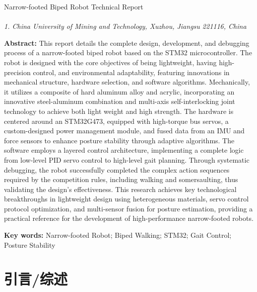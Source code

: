 \documentclass[a4paper,fontset=windows]{ctexart}
\begin{document}
{
    \vspace{1cm}
    \begin{center}
        \heiti Narrow-footed Biped Robot Technical Report \\
        \vspace{0.5cm}
         \\
        \vspace{0.2cm}
         \textit{1. China University of Mining and Technology, Xuzhou, Jiangsu 221116, China}
    \end{center}

    {\bfseries Abstract: }This report details the complete design, development, and debugging process of a narrow-footed biped robot based on the STM32 microcontroller. The robot is designed with the core objectives of being lightweight, having high-precision control, and environmental adaptability, featuring innovations in mechanical structure, hardware selection, and software algorithms. Mechanically, it utilizes a composite of hard aluminum alloy and acrylic, incorporating an innovative steel-aluminum combination and multi-axis self-interlocking joint technology to achieve both light weight and high strength. The hardware is centered around an STM32G473, equipped with high-torque bus servos, a custom-designed power management module, and fused data from an IMU and force sensors to enhance posture stability through adaptive algorithms. The software employs a layered control architecture, implementing a complete logic from low-level PID servo control to high-level gait planning. Through systematic debugging, the robot successfully completed the complex action sequences required by the competition rules, including walking and somersaulting, thus validating the design's effectiveness. This research achieves key technological breakthroughs in lightweight design using heterogeneous materials, servo control protocol optimization, and multi-sensor fusion for posture estimation, providing a practical reference for the development of high-performance narrow-footed robots.

    {\bfseries Key words: }Narrow-footed Robot; Biped Walking; STM32; Gait Control; Posture Stability
}

\newpage

\section{引言/综述}
\end{document}
